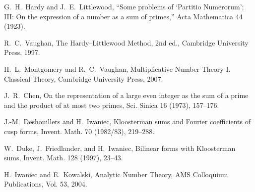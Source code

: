 \documentclass[11pt]{article}
\theoremstyle{definition}
\theoremstyle{remark}
\begin{document}
\begin{thebibliography}{9}
G.~H.~Hardy and J.~E.~Littlewood, ``Some problems of `Partitio Numerorum'; III: On the expression of a number as a sum of primes,'' Acta Mathematica 44 (1923).

R.~C.~Vaughan, The Hardy–Littlewood Method, 2nd ed., Cambridge University Press, 1997.

H.~L.~Montgomery and R.~C.~Vaughan, Multiplicative Number Theory I. Classical Theory, Cambridge University Press, 2007.

J.~R.~Chen, On the representation of a large even integer as the sum of a prime and the product of at most two primes, Sci. Sinica 16 (1973), 157–176.

J.-M.~Deshouillers and H.~Iwaniec, Kloosterman sums and Fourier coefficients of cusp forms, Invent. Math. 70 (1982/83), 219–288.

W.~Duke, J.~Friedlander, and H.~Iwaniec, Bilinear forms with Kloosterman sums, Invent. Math. 128 (1997), 23–43.

H.~Iwaniec and E.~Kowalski, Analytic Number Theory, AMS Colloquium Publications, Vol. 53, 2004.
\end{thebibliography}
\end{document}
